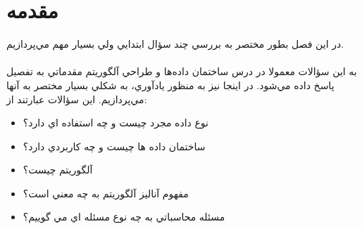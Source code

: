 \documentclass{book}
\begin{document}
\chapter{مقدمه}
در اين فصل بطور مختصر به بررسي چند سؤال ابتدايي ولي بسيار مهم مي‌پردازيم.\\
\\
به اين سؤالات معمولا در درس ساختمان داده‌ها و طراحي آلگوريتم مقدماتي به تفصيل پاسخ داده مي‌شود. در اينجا نيز به منظور يادآوري، به شکلي بسيار مختصر به آنها مي‌پردازيم. اين سؤالات عبارتند از:
\begin{itemize}
	\item
	نوع داده مجرد چيست و چه استفاده اي دارد؟
	\item 
	ساختمان داده ها چيست و چه کاربردي دارد؟
	\item 
	آلگوريتم چيست؟
\item 
	مفهوم آناليز آلگوريتم به چه معني است؟
	\item
	مسئله محاسباتي به چه نوع مسئله اي مي گوييم؟
\end{itemize}
\end{document}
